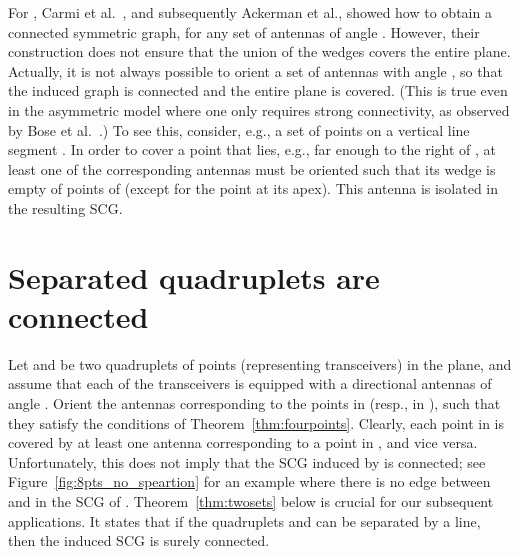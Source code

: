 \documentclass[11pt,letter]{article}
\newcommand{\old}[1]{{{}}}
\begin{document}
For ,
Carmi et al.~\cite{CKLR09}, and subsequently Ackerman et al.\cite{AGP10},
showed how to obtain a connected symmetric graph, for any set of antennas of angle .
However, their construction does not ensure that the union of the wedges covers the entire plane.
Actually, it is not always possible to orient a set of antennas with angle , so that the induced graph is connected and the entire plane is covered. (This is true even in the asymmetric model where one only requires strong connectivity, as observed by Bose et al.~\cite{BCDFKM11}.)
\old{
To see this, consider, e.g., a set  of points on a line.
At least one of the corresponding antennas must be oriented such that its wedge is empty of other points of .
See Figure~\ref{fig:counter_example};
in order to cover the plane, one needs, in particular, to cover the point . However, if  is far enough from the line,
then any antenna that covers  cannot cover any other point of  (except for the point at its apex).
Thus, the antenna that covers  is isolated in the resulting SCG.


\begin{figure}[htp]
   \centering
       \texttt{[image: fig/example\_figure1]}
   \caption{The antenna that covers  is isolated in the resulting SCG.}
   \label{fig:counter_example}
\end{figure}
}
To see this, consider, e.g., a set  of points on a vertical line segment .
In order to cover a point that lies, e.g., far enough to the right of ,
at least one of the corresponding antennas must be oriented such that its wedge is empty of points of  (except for the point at its apex).
This antenna is isolated in the resulting SCG.

\section{Separated quadruplets are connected}\label{sec:A_cub_B}

Let  and  be two quadruplets of points (representing transceivers) in the plane, and assume that each of the transceivers
is equipped with a directional antennas of angle . Orient the antennas corresponding to the points in  (resp., in ),
such that they satisfy the conditions of Theorem~\ref{thm:fourpoints}.
Clearly, each point in  is covered by at least one antenna corresponding to a point in , and vice versa.
Unfortunately, this does not imply that the SCG induced by  is connected;
see Figure~\ref{fig:8pts_no_speartion} for an example where there is no edge between
 and  in the SCG of .
Theorem~\ref{thm:twosets} below is crucial for our subsequent applications. It states that if the quadruplets  and  can be separated
by a line, then the induced SCG is surely connected.
\end{document}
